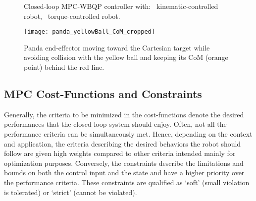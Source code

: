 \begin{figure}
{
		\label{subfig:MPC-QP torque-controlled robot}}	
	\caption{Closed-loop MPC-WBQP controller with:~ kinematic-controlled robot,~ torque-controlled robot.}
\label{fig:MPC-QP}
\end{figure}
\begin{figure}
\centering
\texttt{[image: panda\_yellowBall\_CoM\_cropped]}
\caption{Panda end-effector moving toward the Cartesian target while avoiding collision with the yellow ball and keeping its CoM (orange point) behind the red line.}
\label{fig:pannda&yellowball&CoM}
\end{figure}
\subsection{MPC Cost-Functions and Constraints}
Generally, the criteria to be minimized in the cost-functions denote the desired performances that the closed-loop system should enjoy. Often, not all the performance criteria can be simultaneously met. Hence, depending on the context and application, the criteria describing the desired behaviors the robot should follow are given high weights compared to other criteria intended mainly for optimization purposes. Conversely, the constraints describe the limitations and bounds on both the control input and the state and have a higher priority over the performance criteria. These constraints are qualified as ‘soft’ (small violation is tolerated) or ‘strict’ (cannot be violated). 


